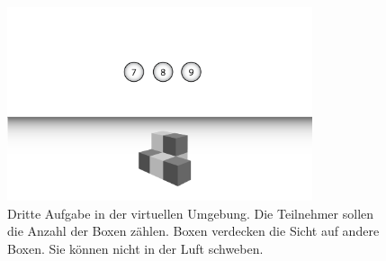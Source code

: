 \begin{figure}[H]
	\centering
	\includegraphics[width=0.8\textwidth]{./images/counting_abstract.png}
	\caption{Dritte Aufgabe in der virtuellen Umgebung. Die Teilnehmer sollen die Anzahl der Boxen zählen. Boxen verdecken die Sicht auf andere Boxen. Sie können nicht in der Luft schweben.}
	\label{fig:counting_abstract}
\end{figure}

